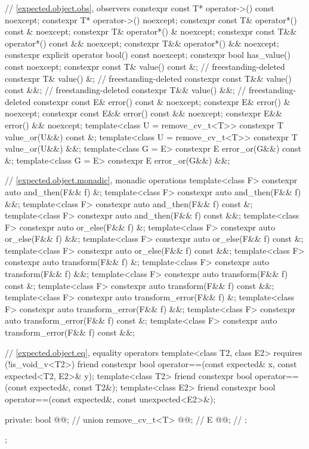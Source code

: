 \begin{codeblock}
{{    // \ref{expected.object.obs}, observers
    constexpr const T* operator->() const noexcept;
    constexpr T* operator->() noexcept;
    constexpr const T& operator*() const & noexcept;
    constexpr T& operator*() & noexcept;
    constexpr const T&& operator*() const && noexcept;
    constexpr T&& operator*() && noexcept;
    constexpr explicit operator bool() const noexcept;
    constexpr bool has_value() const noexcept;
    constexpr const T& value() const &;                                     // freestanding-deleted
    constexpr T& value() &;                                                 // freestanding-deleted
    constexpr const T&& value() const &&;                                   // freestanding-deleted
    constexpr T&& value() &&;                                               // freestanding-deleted
    constexpr const E& error() const & noexcept;
    constexpr E& error() & noexcept;
    constexpr const E&& error() const && noexcept;
    constexpr E&& error() && noexcept;
    template<class U = remove_cv_t<T>> constexpr T value_or(U&&) const &;
    template<class U = remove_cv_t<T>> constexpr T value_or(U&&) &&;
    template<class G = E> constexpr E error_or(G&&) const &;
    template<class G = E> constexpr E error_or(G&&) &&;

    // \ref{expected.object.monadic}, monadic operations
    template<class F> constexpr auto and_then(F&& f) &;
    template<class F> constexpr auto and_then(F&& f) &&;
    template<class F> constexpr auto and_then(F&& f) const &;
    template<class F> constexpr auto and_then(F&& f) const &&;
    template<class F> constexpr auto or_else(F&& f) &;
    template<class F> constexpr auto or_else(F&& f) &&;
    template<class F> constexpr auto or_else(F&& f) const &;
    template<class F> constexpr auto or_else(F&& f) const &&;
    template<class F> constexpr auto transform(F&& f) &;
    template<class F> constexpr auto transform(F&& f) &&;
    template<class F> constexpr auto transform(F&& f) const &;
    template<class F> constexpr auto transform(F&& f) const &&;
    template<class F> constexpr auto transform_error(F&& f) &;
    template<class F> constexpr auto transform_error(F&& f) &&;
    template<class F> constexpr auto transform_error(F&& f) const &;
    template<class F> constexpr auto transform_error(F&& f) const &&;

    // \ref{expected.object.eq}, equality operators
    template<class T2, class E2> requires (!is_void_v<T2>)
      friend constexpr bool operator==(const expected& x, const expected<T2, E2>& y);
    template<class T2>
      friend constexpr bool operator==(const expected&, const T2&);
    template<class E2>
      friend constexpr bool operator==(const expected&, const unexpected<E2>&);

  private:
    bool @@;           // \expos
    union {
      remove_cv_t<T> @@;   // \expos
      E @@;               // \expos
    };
  };
}
\end{codeblock}

